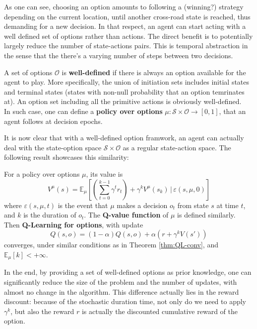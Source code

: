 As one can see, choosing an option amounts to following a (winning?) strategy depending on the current location, until another cross-road state is reached, thus demanding for a new decision. In that respect, an agent can start acting with a well defined set of options rather than actions. The direct benefit is to potentially largely reduce the number of state-actions pairs. This is temporal abstraction in the sense that the there's a varying number of steps between two decisions.

\begin{defi}
  A set of options $\mathcal{O}$ is \textbf{well-defined} if there is always an option available for the agent to play. More specifically, the union of initiation sets includes initial states and terminal states (states with non-null probability that an option temrinates at). An option set including all the primitive actions is obviously well-defined.\\
  In such case, one can define a \textbf{policy over options} $\mu: \mathcal{S}\times \mathcal{O} \to [0,1]$, that an agent follows at decision epochs. 
\end{defi}

It is now clear that with a well-defined option framwork, an agent can actually deal with the state-option space $\mathcal{S}\times \mathcal{O}$ as a regular state-action space. The following result showcases this similarity:

\begin{thm}
  For a policy over options $\mu$, its value is $$V^\mu(s) = \mathbb{E}_\mu \left[ \left(\sum_{t=0}^{k-1}\gamma^t r_t \right) + \gamma^k V^\mu(s_{k}) \,|\, \varepsilon(s, \mu, 0) \right]$$
  where $\varepsilon(s, \mu, t)$ is the event that $\mu$ makes a decision $o_t$ from state $s$ at time $t$, and $k$ is the duration of $o_t$. The \textbf{Q-value function} of $\mu$ is defined similarly.\\
  Then \textbf{Q-Learning for options}, with update $$Q(s, o) = (1 - \alpha)Q(s,o) + \alpha \left( r + \gamma^k V(s') \right)$$ converges, under similar conditions as in Theorem \ref{thm:QL-conv}, and $\mathbb{E}_\mu \left[k \right] < +\infty$.
\end{thm}

In the end, by providing a set of well-defined options as prior knowledge, one can significantly reduce the size of the problem and the number of updates, with almost no change in the algorithm. This difference actually lies in the reward discount: because of the stochastic duration time, not only do we need to apply $\gamma^k$, but also the reward $r$ is actually the discounted cumulative reward of the option.

